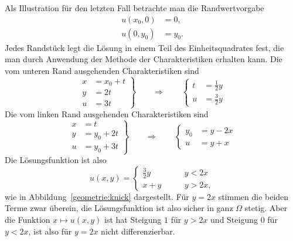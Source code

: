 Als Illustration für den letzten Fall betrachte man die Randwertvorgabe
\begin{align*}
u(x_0,0)&=0,\\
u(0,y_0)&=y_0.
\end{align*}
Jedes Randstück legt die Lösung in einem Teil des Einheitsquadrates
fest, die man durch Anwendung der Methode der Charakteristiken erhalten
kann. Die vom unteren Rand ausgehenden Charakteristiken sind
\[
\left.
\begin{aligned}
x&=x_0+t\\
y&=2t\\
u&=3t
\end{aligned}
\right\}
\qquad\Rightarrow\qquad
\left\{
\begin{aligned}
t&=\frac12y\\
u&=\frac32y
\end{aligned}
\right.
\]
Die vom linken Rand ausgehenden Charakteristiken sind 
\[
\left.
\begin{aligned}
x&=t\\
y&=y_0+2t\\
u&=y_0+3t
\end{aligned}
\right\}
\qquad\Rightarrow\qquad
\left\{
\begin{aligned}
y_0&=y-2x\\
u&=y+x
\end{aligned}
\right.
\]
Die Lösungsfunktion ist also
\[
u(x,y)=\begin{cases}
\frac32y&\qquad y<2x\\
x+y&\qquad y>2x,
\end{cases}
\]
wie in Abbildung~\ref{geometrie:knick} dargestellt.
Für $y=2x$ stimmen die beiden Terme zwar überein, die Lösungsfunktion
ist also sicher in ganz $\Omega$ stetig.
Aber die
Funktion $x\mapsto u(x,y)$ ist hat Steigung $1$ für $y>2x$ und
Steigung 0 für $y<2x$, ist also für $y=2x$ nicht differenzierbar.

